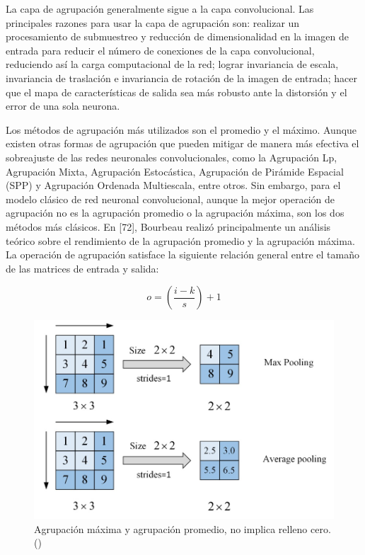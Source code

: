 La capa de agrupación generalmente sigue a la capa convolucional. Las principales razones para usar la capa de agrupación son: realizar un procesamiento de submuestreo y reducción de dimensionalidad en la imagen de entrada para reducir el número de conexiones de la capa convolucional, reduciendo así la carga computacional de la red; lograr invariancia de escala, invariancia de traslación e invariancia de rotación de la imagen de entrada; hacer que el mapa de características de salida sea más robusto ante la distorsión y el error de una sola neurona.

Los métodos de agrupación más utilizados son el promedio y el máximo. Aunque existen otras formas de agrupación que pueden mitigar de manera más efectiva el sobreajuste de las redes neuronales convolucionales, como la Agrupación Lp, Agrupación Mixta, Agrupación Estocástica, Agrupación de Pirámide Espacial (SPP) y Agrupación Ordenada Multiescala, entre otros. Sin embargo, para el modelo clásico de red neuronal convolucional, aunque la mejor operación de agrupación no es la agrupación promedio o la agrupación máxima, son los dos métodos más clásicos. En [72], Bourbeau realizó principalmente un análisis teórico sobre el rendimiento de la agrupación promedio y la agrupación máxima. La operación de agrupación satisface la siguiente relación general entre el tamaño de las matrices de entrada y salida:

\[o = \left( \frac{{i - k}}{s} \right) + 1 \]

\begin{figure}[H]
	\begin{center}
		\includegraphics[width=1\textwidth]{2/figures/cnn2.jpeg}
		\caption{Agrupación máxima y agrupación promedio, no implica relleno cero.(\cite{tecnica2})}
	\end{center}
\end{figure}

